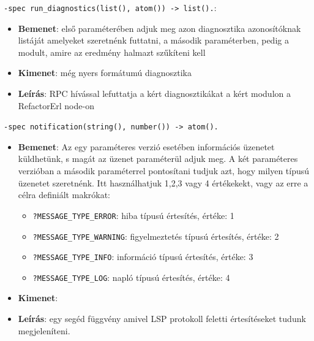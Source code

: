     
    
    
    \noindent \lstinline{-spec run_diagnostics(list(), atom()) -> list().}:
    \begin{itemize}
            \item \textbf{Bemenet}:  első paraméterében adjuk meg azon diagnosztika azonosítóknak listáját amelyeket szeretnénk futtatni, a második paraméterben, pedig a modult, amire az eredmény halmazt szűkíteni kell
            \item \textbf{Kimenet}: még nyers formátumú diagnosztika
            \item \textbf{Leírás}: RPC hívással lefuttatja a kért diagnosztikákat a kért modulon a RefactorErl node-on
        \end{itemize}
    
    
    
    
    \noindent \lstinline{-spec notification(string(), number()) -> atom().} 
        \begin{itemize}
            \item \textbf{Bemenet}: Az egy paraméteres verzió esetében információs üzenetet küldhetünk, s magát az üzenet paraméterül adjuk meg. A két paraméteres verzióban a második paraméterrel pontosítani tudjuk azt, hogy milyen típusú üzenetet szeretnénk. Itt használhatjuk 1,2,3 vagy 4 értékekekt, vagy az erre a célra definiált makrókat:
            \begin{itemize}
                \item \lstinline{?MESSAGE_TYPE_ERROR}: hiba típusú értesítés, értéke: 1
                \item \lstinline{?MESSAGE_TYPE_WARNING}: figyelmeztetés típusú értesítés, értéke: 2
                \item \lstinline{?MESSAGE_TYPE_INFO}: információ típusú értesítés, értéke: 3
                \item \lstinline{?MESSAGE_TYPE_LOG}: napló típusú értesítés, értéke: 4
            \end{itemize}   
            \item \textbf{Kimenet}: 
            \item \textbf{Leírás}: egy segéd függvény amivel LSP protokoll feletti értesítéseket tudunk megjeleníteni. 
        \end{itemize}
    
    
    
